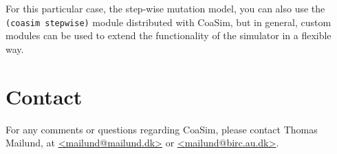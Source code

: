 \documentclass{manual}
\begin{document}
\begin{empfile}
For this particular case, the step-wise mutation model, you can also
use the \texttt{(coasim stepwise)} module distributed with CoaSim, but
in general, custom modules can be used to extend the functionality of
the simulator in a flexible way.

\section{Contact}
\label{sec:contact}

For any comments or questions regarding CoaSim, please contact Thomas
Mailund, at \url{<mailund@mailund.dk>} or \url{<mailund@birc.au.dk>}.


\end{empfile}
\end{document}

